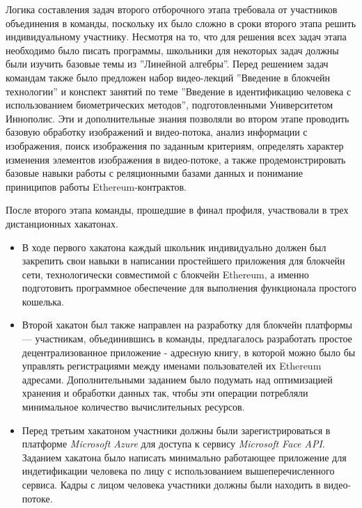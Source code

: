 \documentclass[a4paper,12pt,oneside]{book}
\begin{document}
Логика составления задач второго отборочного этапа требовала от
участников объединения в команды, поскольку их было сложно в сроки
второго этапа решить индивидуальному участнику. Несмотря на то, что
для решения всех задач этапа необходимо было писать программы,
школьники для некоторых задач должны были изучить базовые темы из
''Линейной алгебры''. Перед решением задач командам также было
предложен набор видео-лекций ''Введение в блокчейн технологии'' и
конспект занятий по теме ''Введение в идентификацию человека с
использованием биометрических методов'', подготовленными Университетом
Иннополис. Эти и дополнительные знания позволяли во втором этапе
проводить базовую обработку изображений и видео-потока, анализ
информации с изображения, поиск изображения по заданным критериям,
определять характер изменения элементов изображения в видео-потоке, а
также продемонстрировать базовые навыки работы с реляционными базами
данных и понимание приниципов работы Ethereum-контрактов.

После второго этапа команды, прошедшие в финал профиля, участвовали в
трех дистанционных хакатонах.

\begin{itemize}
\item В ходе первого хакатона каждый школьник индивидуально должен был
закрепить свои навыки в написании простейшего приложения для блокчейн
сети, технологически совместимой с блокчейн Ethereum, а именно
подготовить программное обеспечение для выполнения функционала
простого кошелька.

\item Второй хакатон был также направлен на разработку для блокчейн
платформы --- участникам, объединившись в команды, предлагалось
разработать простое децентрализованное приложение - адресную книгу, в
которой можно было бы управлять регистрациями между именами
пользователей их Ethereum адресами. Дополнительными заданием было
подумать над оптимизацией хранения и обработки данных так, чтобы эти
операции потребляли минимальное количество вычислительных ресурсов.

\item Перед третьим хакатоном участники должны были зарегистрироваться
в платформе \textit{Microsoft Azure} для доступа к сервису
\textit{Microsoft Face API}. Заданием хакатона было написать
минимально работающее приложение для индетификации человека по лицу с
использованием вышеперечисленного сервиса. Кадры с лицом человека
участники должны были находить в видео-потоке.

\end{itemize}
\end{document}
